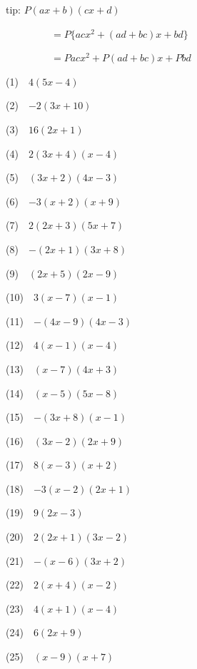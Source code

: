 \documentclass[a4j,twocolumn,10pt,fleqn]{jarticle}
\begin{document}
tip: $P(ax + b)(cx + d)$

~~~~~~~~~$= P\{acx^2 + (ad + bc)x +bd\}$

~~~~~~~~~$= Pacx^2 + P(ad + bc)x + Pbd$

(1)~~$4(5x-4)$

(2)~~$-2(3x+10)$

(3)~~$16(2x+1)$

(4)~~$2(3x+4)(x-4)$

(5)~~$(3x+2)(4x-3)$

(6)~~$-3(x+2)(x+9)$

(7)~~$2(2x+3)(5x+7)$

(8)~~$-(2x+1)(3x+8)$

(9)~~$(2x+5)(2x-9)$

(10)~~$3(x-7)(x-1)$

(11)~~$-(4x-9)(4x-3)$

(12)~~$4(x-1)(x-4)$

(13)~~$(x-7)(4x+3)$

(14)~~$(x-5)(5x-8)$

(15)~~$-(3x+8)(x-1)$

(16)~~$(3x-2)(2x+9)$

(17)~~$8(x-3)(x+2)$

(18)~~$-3(x-2)(2x+1)$

(19)~~$9(2x-3)$

(20)~~$2(2x+1)(3x-2)$

(21)~~$-(x-6)(3x+2)$

(22)~~$2(x+4)(x-2)$

(23)~~$4(x+1)(x-4)$

(24)~~$6(2x+9)$

(25)~~$(x-9)(x+7)$
\end{document}
